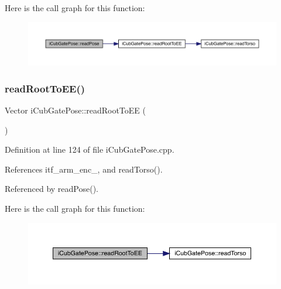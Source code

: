 Here is the call graph for this function\+:
\nopagebreak
\begin{figure}[H]
\begin{center}
\leavevmode
\includegraphics[width=350pt]{classiCubGatePose_aff1494edcf8f17803788f954ba0b443b_cgraph}
\end{center}
\end{figure}
\mbox{\label{classiCubGatePose_a78b89d0b90d60b37a5f613718d384590}} 
\subsubsection{\texorpdfstring{read\+Root\+To\+E\+E()}{readRootToEE()}}
{\footnotesize\ttfamily Vector i\+Cub\+Gate\+Pose\+::read\+Root\+To\+EE (\begin{DoxyParamCaption}{ }\end{DoxyParamCaption})\hspace{0.3cm}{\ttfamily [protected]}}



Definition at line 124 of file i\+Cub\+Gate\+Pose.\+cpp.



References itf\+\_\+arm\+\_\+enc\+\_\+, and read\+Torso().



Referenced by read\+Pose().

Here is the call graph for this function\+:
\nopagebreak
\begin{figure}[H]
\begin{center}
\leavevmode
\includegraphics[width=350pt]{classiCubGatePose_a78b89d0b90d60b37a5f613718d384590_cgraph}
\end{center}
\end{figure}
\mbox{\label{classiCubGatePose_ab03607afcf2246d5d1d18835c623fc34}} 
